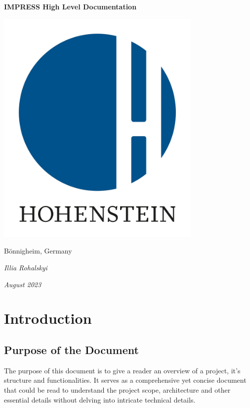 \documentclass{report}
\begin{document}
\begin{titlepage}
    \centerline{\Huge\textbf{IMPRESS High Level Documentation}}
    
    \vspace*{2cm}
    
    \centerline{\includegraphics[width=10cm]{hohenstein logo.jpg}}
    
    \vspace*{1.5cm}
    
    \centerline{\LARGE Bönnigheim, Germany}
    
    \vspace*{1cm}
    
    \centerline{\Large\textit{Illia Rohalskyi}}
    
    \vspace*{0.5cm}
    
    \centerline{\Large\textit{August 2023}}
    
\end{titlepage}

\tableofcontents
\chapter{Introduction}
\section{Purpose of the Document}
The purpose of this document is to give a reader an overview of a project, it's structure and functionalities. It serves as a comprehensive yet concise document that could be read to understand the project scope, architecture and other essential details without delving into intricate technical details.
\end{document}
